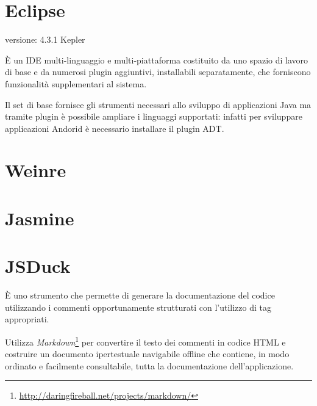 \section{Eclipse}
\begin{description}
\item[versione: 4.3.1 Kepler]
\end{description}

È un \ac{IDE} multi-linguaggio e multi-piattaforma costituito da uno spazio di lavoro di base e da numerosi plugin aggiuntivi, installabili separatamente, che forniscono funzionalità supplementari al sistema.

Il set di base fornisce gli strumenti necessari allo sviluppo di applicazioni Java ma tramite plugin è possibile ampliare i linguaggi supportati: infatti per sviluppare applicazioni Andorid è necessario installare il plugin \ac{ADT}.

\section{Weinre}

\section{Jasmine}

\section{JSDuck}
È uno strumento che permette di generare la documentazione del codice utilizzando i commenti opportunamente strutturati con l'utilizzo di tag appropriati.

Utilizza \emph{Markdown}\footnote{\url{http://daringfireball.net/projects/markdown/}} per convertire il testo dei commenti in codice \ac{HTML} e costruire un documento ipertestuale navigabile offline che contiene, in modo ordinato e facilmente consultabile, tutta la documentazione dell'applicazione.